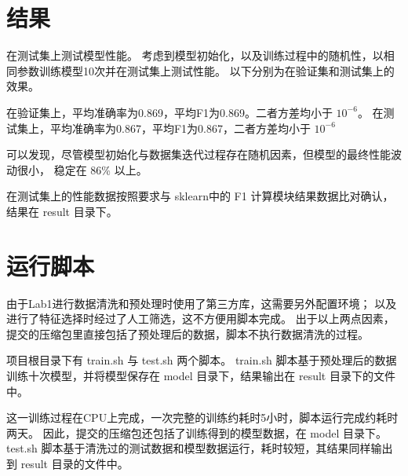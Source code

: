 \documentclass[12pt,letterpaper]{article}
\begin{document}
\section{结果}
在测试集上测试模型性能。
考虑到模型初始化，以及训练过程中的随机性，以相同参数训练模型10次并在测试集上测试性能。
以下分别为在验证集和测试集上的效果。

在验证集上，平均准确率为0.869，平均F1为0.869。二者方差均小于 $10^{-6}$。
在测试集上，平均准确率为0.867，平均F1为0.867，二者方差均小于 $10^{-6}$

可以发现，尽管模型初始化与数据集迭代过程存在随机因素，但模型的最终性能波动很小，
稳定在 86\% 以上。

在测试集上的性能数据按照要求与 sklearn中的 F1 计算模块结果数据比对确认，
结果在 result 目录下。


\section{运行脚本}
由于Lab1进行数据清洗和预处理时使用了第三方库，这需要另外配置环境；
以及进行了特征选择时经过了人工筛选，这不方便用脚本完成。
出于以上两点因素，提交的压缩包里直接包括了预处理后的数据，脚本不执行数据清洗的过程。

项目根目录下有 train.sh 与 test.sh 两个脚本。
train.sh 脚本基于预处理后的数据训练十次模型，并将模型保存在 model 目录下，结果输出在 result 目录下的文件中。

这一训练过程在CPU上完成，一次完整的训练约耗时5小时，脚本运行完成约耗时两天。
因此，提交的压缩包还包括了训练得到的模型数据，在 model 目录下。
test.sh 脚本基于清洗过的测试数据和模型数据运行，耗时较短，其结果同样输出到 result 目录的文件中。
\end{document}
